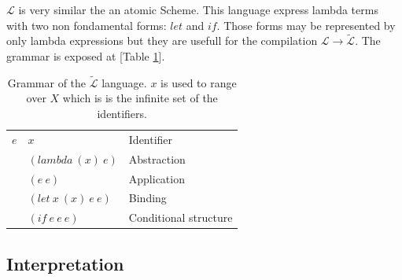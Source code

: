 \documentclass[a4paper]{report}
\newcommand{\lang}[0]{\mathcal{L}}
\newcommand{\locus}[1]{\widetilde{#1}}
\newcommand{\reftab}[1]{[Table \ref{#1}]}
\begin{document}
$\lang$ is very similar the an atomic Scheme. This language express lambda terms with two non fondamental forms: $let$ and $if$. Those forms may be represented by only lambda expressions but they are usefull for the compilation $\lang\to\locus{\lang}$. The grammar is exposed at \reftab{l_grammar}.

\begin{table}
\centering
\begin{tabular}{|r|l|l|}
\hline
$e$ & $x$ & Identifier\\
& $(lambda\ (x)\ e)$ & Abstraction\\
& $(e\ e)$ & Application\\
& $(let\ x\ (x)\ e\ e)$ & Binding\\
& $(if\ e\ e\ e)$ & Conditional structure\\
\hline
\end{tabular}
\caption{Grammar of the $\locus{\lang}$ language. $x$ is used to range over $X$ which is is the infinite set of the identifiers.}
\label{l_grammar}
\end{table}

\subsection{Interpretation}
\end{document}
